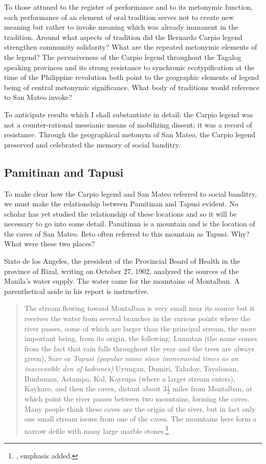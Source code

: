 To those attuned to the register of performance and to its metonymic function, each performance of an element of oral tradition serves not to create new meaning but rather to invoke meaning which was already immanent in the tradition. Around what aspects of tradition did the Bernardo Carpio legend strengthen community solidarity? What are the repeated metonymic elements of the legend? The pervasiveness of the Carpio legend throughout the Tagalog speaking provinces and its strong resistance to synchronic ecotypification at the time of the Philippine revolution both point to the geographic elements of legend being of central metonymic significance. What body of traditions would reference to San Mateo invoke? 

To anticipate results which I shall substantiate in detail: the Carpio legend was not a counter-rational messianic means of mobilizing dissent; it was a record of resistance. Through the geographical metonym of San Mateo, the Carpio legend preserved and celebrated the memory of social banditry.

\subsection{Pamitinan and Tapusi}

To make clear how the Carpio legend and San Mateo referred to social banditry, we must make the relationship between Pamitinan and Tapusi evident. No scholar has yet studied the relationship of these locations and so it will be necessary to go into some detail. Pamitinan is a mountain and is the location of the caves of San Mateo. Ileto often referred to this mountain as Tapusi. Why? What were these two places? 

Sixto de los Angeles, the president of the Provincial Board of Health in the province of Rizal, writing on October 27, 1902, analyzed the sources of the Manila's water supply. The water came for the mountains of Montalban. A parenthetical aside in his report is instructive.

\begin{quote}
The stream flowing toward Montalban is very small near its source but it receives the water from several branches in the various points where the river passes, some of which are larger than the principal stream, the more important being, from its origin, the following: Lumutan (the name comes from the fact that rain falls throughout the year and the trees are always green), Sare or \textit{Tapusi (popular name since immemorial times as an inaccessible den of ladrones)} Uyungan, Dumiri, Taladoy, Tayabasan, Bunbunan, Astampa, Kal, Kayrupa (where a larger stream enters), Kaykaro, and then the caves, distant about 3\( \tfrac{1}{2} \) miles from Montalban, at which point the river passes between two mountains, forming the caves. Many people think these caves are the origin of the river, but in fact only one small stream issues from one of the caves. The mountains here form a narrow defile with many large marble stones.\footnote{\cite[221]{Angeles1904}, emphasis added.} 
\end{quote}

